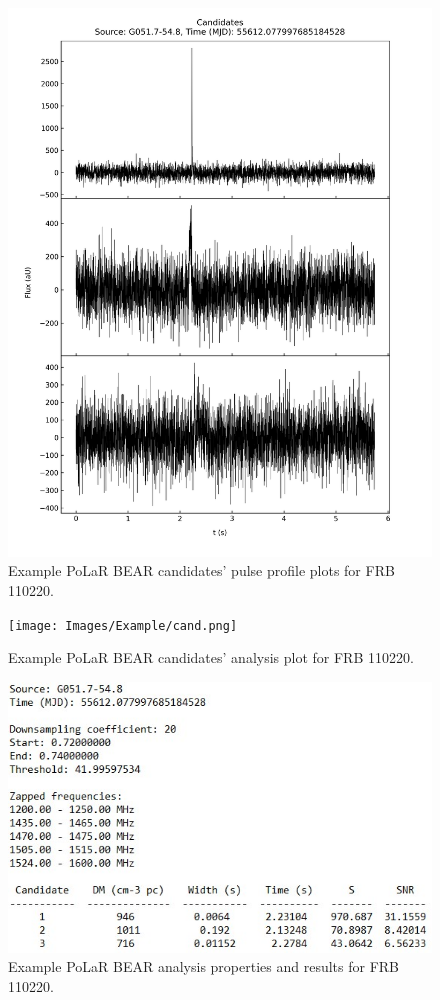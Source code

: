 \begin{appendices}
\begin{figure}
    \centering
    \includegraphics[width=\textwidth]{Images/Example/profile.jpeg}
    \caption[Example PoLaR BEAR candidates' pulse profile plots]{Example PoLaR BEAR candidates' pulse profile plots for FRB 110220.}
    \label{fig:prof}
\end{figure}

\begin{figure}
    \centering
    \texttt{[image: Images/Example/cand.png]}
    \caption[Example PoLaR BEAR candidates' analysis plot]{Example PoLaR BEAR candidates' analysis plot for FRB 110220.}
    \label{fig:cand}
\end{figure}

\begin{figure}
    \centering
    \includegraphics[width=\textwidth]{Images/Example/prop.jpg}
    \caption[Example PoLaR BEAR analysis properties and results]{Example PoLaR BEAR analysis properties and results for FRB 110220.}
    \label{fig:prop}
\end{figure}
\end{appendices}